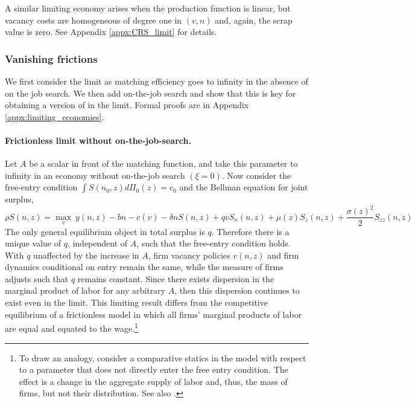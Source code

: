 A similar limiting economy arises when the production function is linear, but vacancy costs are homogeneous of degree one in $(v,n)$ and, again, the scrap value is zero. See Appendix \ref{appx:CRS_limit} for details.

\subsubsection{Vanishing frictions}
We first consider the limit as matching efficiency goes to infinity in the absence of on the job search.
We then add on-the-job search and show that this is key for obtaining a version of \citet{HopenhaynEMET} in the limit.
Formal proofs are in Appendix \ref{appx:limiting_economies}.

\paragraph{Frictionless limit without on-the-job-search.}
Let $A$ be a scalar in front of the matching function, and take this parameter to infinity in an economy without on-the-job search $(\xi=0)$.
Now consider the  free-entry condition $\int S(n_0,z)d\Pi_0(z) = c_0$ and the Bellman equation for joint surplus,
{
\begin{equation}
\rho S(n,z) = \max_v \:y(n,z) - bn - c(v) - \delta nS(n,z) + qvS_n(n,z) + \mu(z) S_z(n,z) + \frac{\sigma(z)^2}{2} S_{zz}(n,z)
\end{equation}}%
The only general equilibrium object in total surplus is $q$.
Therefore there is a unique value of $q$, independent of $A$, such that the free-entry condition holds.
With $q$ unaffected by the increase in $A$, firm vacancy policies $v(n,z)$ and firm dynamics conditional on entry remain the same, while the measure of firms adjusts such that $q$ remains constant.
Since there exists dispersion in the marginal product of labor for any arbitrary $A$, then this dispersion continues to exist even in the limit.
This limiting result differs from the competitive equilibrium of a frictionless model in which all firms' marginal products of labor are equal and equated to the wage.\footnote{To draw an analogy, consider a comparative statics in the \citet{HopenhaynEMET} model with respect to a parameter that does not directly enter the free entry condition. The effect is a change in the aggregate supply of labor and, thus, the mass of firms, but not their distribution. See also \citet{kaas2020block}.}

\vspace*{-.3cm}
